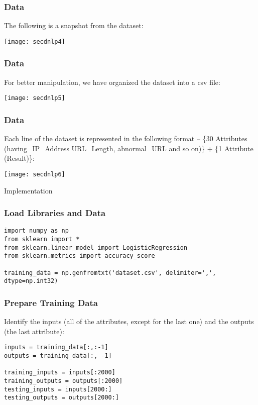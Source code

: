 \begin{frame}[fragile]\frametitle{Data}
The following is a snapshot from the dataset:
	    \begin{center}
     \texttt{[image: secdnlp4]}      
     \end{center}
\end{frame}

\begin{frame}[fragile]\frametitle{Data}
For better manipulation, we have organized the dataset into a csv file:
	    \begin{center}
     \texttt{[image: secdnlp5]}      
     \end{center}
\end{frame}

\begin{frame}[fragile]\frametitle{Data}
Each line of the dataset is represented in the following format – \{30 Attributes (having\_IP\_Address URL\_Length, abnormal\_URL and so on)\} + \{1 Attribute (Result)\}:

	    \begin{center}
     \texttt{[image: secdnlp6]}      
     \end{center}
\end{frame}

\begin{frame}
  \begin{center}
    {\Large Implementation}
  \end{center}
\end{frame}

\begin{frame}[fragile]\frametitle{Load Libraries and Data}
\begin{lstlisting}
import numpy as np
from sklearn import *
from sklearn.linear_model import LogisticRegression
from sklearn.metrics import accuracy_score

training_data = np.genfromtxt('dataset.csv', delimiter=',', dtype=np.int32)
\end{lstlisting}
\end{frame}

\begin{frame}[fragile]\frametitle{Prepare Training Data}

Identify the inputs (all of the attributes, except for the last one) and the outputs (the last attribute):

\begin{lstlisting}
inputs = training_data[:,:-1]
outputs = training_data[:, -1]

training_inputs = inputs[:2000]
training_outputs = outputs[:2000] 
testing_inputs = inputs[2000:]
testing_outputs = outputs[2000:]
\end{lstlisting}
\end{frame}

